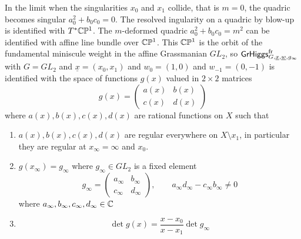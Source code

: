 \documentclass[12pt,psamsfonts,reqno]{amsart}
\begin{document}
\begin{remark}
  In the limit when the singularities $x_0$ and $x_1$ collide, that is $m = 0$,
  the quadric becomes singular $a_0^2 + b_0 c_0 = 0$. The resolved
  ingularity on a quadric by blow-up is identified with $T^{*} \mathbb C \mathbb P^1$.
  The $m$-deformed quadric $a_0^2 + b_0 c_0 = m^2$ can be identified
  with affine line bundle over $\mathbb C \mathbb P^1$. This $\mathbb C \mathbb P^1$ is the orbit
  of the fundamental miniscule weight in the affine Grassmanian $GL_2$,
  so $\mathsf{GrHiggs}^{\mathrm{fr}}_{G,\underline{x}, \underline{w}, g_\infty}$
   with $G = GL_2$ and $\underline{x} = (x_0, x_1)$ and $w_0 = (1,0)$ and $w_{-1} = (0,-1)$ is identified with the space of functions $g(x)$
   valued in $2 \times 2$ matrices
   \begin{equation}
     g(x) =
     \begin{pmatrix}
       a(x) & b(x) \\
       c(x) & d(x)
     \end{pmatrix}
   \end{equation}
   where $a(x), b(x), c(x), d(x)$ are rational functions on $X$ such that 
   \begin{enumerate}
   \item $a(x), b(x), c(x), d(x)$ are regular everywhere on $X \setminus {x_1}$,
     in particular they are regular at $x_\infty = \infty$ and $x_0$.
   \item $g(x_\infty) = g_\infty$ where $g_\infty \in GL_2$ is a fixed element
     \begin{equation}
       g_\infty =
       \begin{pmatrix}
         a_\infty & b_\infty \\
         c_\infty & d_\infty 
       \end{pmatrix}, \qquad a_\infty d_\infty - c_\infty b_\infty \neq 0 
     \end{equation}
where $a_\infty, b_\infty, c_\infty, d_\infty \in \mathbb C$ 
   \item
     \begin{equation}
       \det g(x) =  \frac{ x- x_0}{ x - x_1}  \det g_\infty
     \end{equation}
   \end{enumerate}
 

\end{remark}
\end{document}
